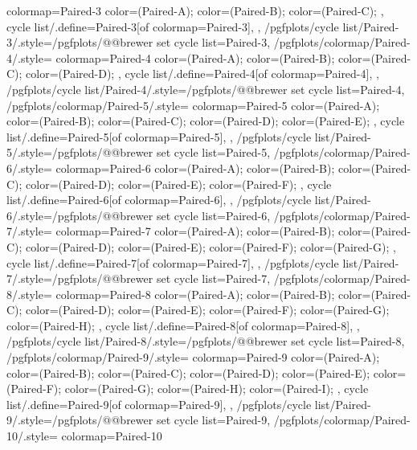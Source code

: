 {{    colormap={Paired-3}{
      color=(Paired-A);
      color=(Paired-B);
      color=(Paired-C);
    },
    cycle list/.define={Paired-3}{[of colormap=Paired-3]},
  },
  /pgfplots/cycle list/Paired-3/.style={/pgfplots/@@brewer set cycle list={Paired-3}},
  /pgfplots/colormap/Paired-4/.style={
    colormap={Paired-4}{
      color=(Paired-A);
      color=(Paired-B);
      color=(Paired-C);
      color=(Paired-D);
    },
    cycle list/.define={Paired-4}{[of colormap=Paired-4]},
  },
  /pgfplots/cycle list/Paired-4/.style={/pgfplots/@@brewer set cycle list={Paired-4}},
  /pgfplots/colormap/Paired-5/.style={
    colormap={Paired-5}{
      color=(Paired-A);
      color=(Paired-B);
      color=(Paired-C);
      color=(Paired-D);
      color=(Paired-E);
    },
    cycle list/.define={Paired-5}{[of colormap=Paired-5]},
  },
  /pgfplots/cycle list/Paired-5/.style={/pgfplots/@@brewer set cycle list={Paired-5}},
  /pgfplots/colormap/Paired-6/.style={
    colormap={Paired-6}{
      color=(Paired-A);
      color=(Paired-B);
      color=(Paired-C);
      color=(Paired-D);
      color=(Paired-E);
      color=(Paired-F);
    },
    cycle list/.define={Paired-6}{[of colormap=Paired-6]},
  },
  /pgfplots/cycle list/Paired-6/.style={/pgfplots/@@brewer set cycle list={Paired-6}},
  /pgfplots/colormap/Paired-7/.style={
    colormap={Paired-7}{
      color=(Paired-A);
      color=(Paired-B);
      color=(Paired-C);
      color=(Paired-D);
      color=(Paired-E);
      color=(Paired-F);
      color=(Paired-G);
    },
    cycle list/.define={Paired-7}{[of colormap=Paired-7]},
  },
  /pgfplots/cycle list/Paired-7/.style={/pgfplots/@@brewer set cycle list={Paired-7}},
  /pgfplots/colormap/Paired-8/.style={
    colormap={Paired-8}{
      color=(Paired-A);
      color=(Paired-B);
      color=(Paired-C);
      color=(Paired-D);
      color=(Paired-E);
      color=(Paired-F);
      color=(Paired-G);
      color=(Paired-H);
    },
    cycle list/.define={Paired-8}{[of colormap=Paired-8]},
  },
  /pgfplots/cycle list/Paired-8/.style={/pgfplots/@@brewer set cycle list={Paired-8}},
  /pgfplots/colormap/Paired-9/.style={
    colormap={Paired-9}{
      color=(Paired-A);
      color=(Paired-B);
      color=(Paired-C);
      color=(Paired-D);
      color=(Paired-E);
      color=(Paired-F);
      color=(Paired-G);
      color=(Paired-H);
      color=(Paired-I);
    },
    cycle list/.define={Paired-9}{[of colormap=Paired-9]},
  },
  /pgfplots/cycle list/Paired-9/.style={/pgfplots/@@brewer set cycle list={Paired-9}},
  /pgfplots/colormap/Paired-10/.style={
    colormap={Paired-10}{
}}}

